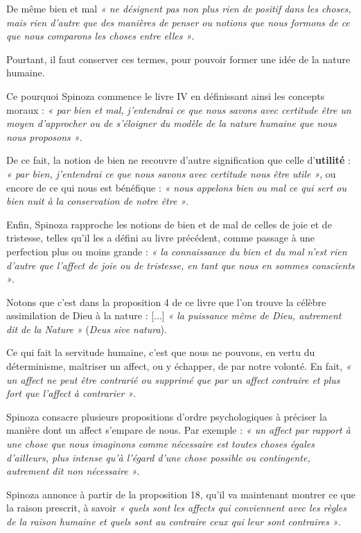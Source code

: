 De même bien et mal {\it « ne désignent pas non plus rien de positif dans les choses,
mais rien d’autre que des manières de penser ou notions que nous formons de ce
que nous comparons les choses entre elles »}.

\vspace{0.5cm}
Pourtant, il faut conserver ces termes, pour pouvoir former une idée de la
nature humaine.

Ce pourquoi Spinoza commence le livre IV en définissant ainsi les concepts
moraux : {\it « par bien et mal, j’entendrai ce que nous savons avec certitude
être un moyen d’approcher ou de s’éloigner du modèle de la nature humaine
que nous nous proposons »}.

De ce fait, la notion de bien ne recouvre d’autre signification que celle
d’{\bf utilité} : {\it « par bien, j’entendrai ce que nous savons avec certitude nous
être utile »}, ou encore de ce qui nous est bénéfique : {\it « nous appelons bien
ou mal ce qui sert ou bien nuit à la conservation de notre être »}.

Enfin, Spinoza rapproche les notions de bien et de mal de celles de joie et
de tristesse, telles qu’il les a défini au livre précédent, comme passage à
une perfection plus ou moins grande : {\it « la connaissance du bien et du mal
n’est rien d’autre que l’affect de joie ou de tristesse, en tant que nous en
sommes conscients »}.

\vspace{0.5cm}
Notons que c’est dans la proposition 4 de ce livre que l’on trouve la célèbre
assimilation de Dieu à la nature : [...] {\it « la puissance même de Dieu, autrement
dit de la Nature »} ({\it Deus sive natura}).

\vspace{0.5cm}
Ce qui fait la servitude humaine, c’est que nous ne pouvons, en vertu du
déterminisme, maîtriser un affect, ou y échapper, de par notre volonté.
En fait, {\it « un affect ne peut être contrarié ou supprimé que par un affect
contraire et plus fort que l’affect à contrarier »}.

Spinoza consacre plusieurs propositions d’ordre psychologiques à préciser
la manière dont un affect s’empare de nous. Par exemple : {\it « un affect par
rapport à une chose que nous imaginons comme nécessaire est toutes choses
égales d’ailleurs, plus intense qu’à l’égard d’une chose possible ou
contingente, autrement dit non nécessaire »}.

\vspace{0.5cm}
Spinoza annonce à partir de la proposition 18, qu’il va maintenant montrer
ce que la raison prescrit, à savoir {\it « quels sont les affects qui conviennent
avec les règles de la raison humaine et quels sont au contraire ceux qui leur
sont contraires »}.

